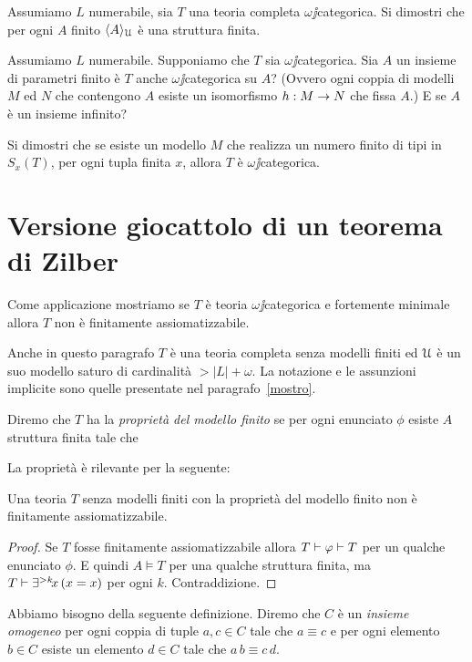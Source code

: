 \begin{exercise}
Assumiamo $L$ numerabile, sia $T$ una teoria completa $\omega\jj$categorica. Si  dimostri che per ogni $A$ finito $\langle A\rangle_\EuScript U$ \`e una struttura finita.\QED
\end{exercise}

\begin{exercise}
Assumiamo $L$ numerabile. Supponiamo che $T$ sia $\omega\jj$categorica. Sia $A$ un insieme di parametri finito \`e $T$ anche $\omega\jj$categorica su $A$? (Ovvero ogni coppia di modelli $M$ ed $N$ che contengono $A$ esiste un isomorfismo $h:M\rightarrow N$ che fissa $A$.) E se $A$ \`e un insieme infinito?\QED
\end{exercise}

\begin{exercise}
Si dimostri che se esiste un modello $M$ che realizza un numero finito di tipi in $S_x(T)$, per ogni tupla finita $x$, allora $T$ \`e $\omega\jj$categorica.\QED
\end{exercise}


\section{Versione giocattolo di un teorema di Zilber}

Come applicazione mostriamo se $T$ \`e teoria $\omega\jj$categorica e fortemente minimale allora $T$ non \`e finitamente assiomatizzabile.

Anche in questo paragrafo $T$ \`e una teoria completa senza modelli finiti ed $\EuScript U$ \`e un suo modello saturo di cardinalit\`a $>|L|+\omega$. La notazione e le assunzioni implicite sono quelle presentate nel paragrafo~\ref{mostro}.

Diremo che $T$ ha la \emph{propriet\`a del modello finito\/} se per ogni enunciato $\phi$ esiste $A$ struttura finita tale che 


La propriet\`a \`e rilevante per la seguente:

\begin{proposition}\label{prop_pmf_fa}
Una teoria $T$ senza modelli finiti con la propriet\`a del modello finito non \`e finitamente assiomatizzabile.
\end{proposition}
\begin{proof}
Se $T$ fosse finitamente assiomatizzabile allora $T\vdash\varphi\vdash T$ per un qualche enunciato $\phi$. E quindi $A\models T$ per una qualche struttura finita, ma $T\vdash \exists^{>k}\!x\,(x=x)$ per ogni $k$. Contraddizione.
\end{proof}
Abbiamo bisogno della seguente definizione. Diremo che $C$ \`e un \emph{insieme omogeneo\/} per ogni coppia di tuple $a,c\in C$ tale che $a\equiv c$ e per ogni elemento  $b\in C$ esiste un elemento $d\in C$ tale che $a\,b\equiv c\,d$.

